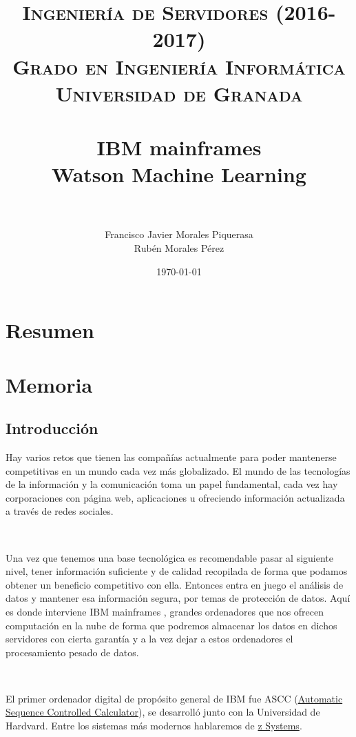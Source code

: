 \documentclass[paper=a4, fontsize=10pt]{scrartcl} %
\title{	
\normalfont \normalsize 
\textsc{\textbf{Ingeniería de Servidores (2016-2017)} \\ Grado en Ingeniería Informática \\ Universidad de Granada} \\ [25pt] %
\horrule{0.5pt} \\[0.4cm] %
\huge IBM mainframes \\ Watson Machine Learning \\ %
\horrule{2pt} \\[0.5cm] %
}
\author{Francisco Javier Morales Piquerasa
	\\ Rubén Morales Pérez} %
\date{\normalsize\today} %
\numberwithin{equation}{section} %
\numberwithin{figure}{section} %
\numberwithin{table}{section} %
\begin{document}
\maketitle %
\newpage %
\tableofcontents %
\listoffigures
\listoftables

\newpage


\section{Resumen}


\section{Memoria}
\subsection{Introducción}
Hay varios retos que tienen las compañías actualmente para poder mantenerse competitivas en un mundo cada vez más globalizado.
El mundo de las tecnologías de la información y la comunicación toma un papel fundamental, cada vez hay corporaciones con página web, aplicaciones u ofreciendo información actualizada a través de redes sociales.

\

Una vez que tenemos una base tecnológica es recomendable pasar al siguiente nivel, tener información suficiente y de calidad recopilada de forma que podamos obtener un beneficio competitivo con ella.
Entonces entra en juego el análisis de datos y mantener esa información segura, por temas de protección de datos.
Aquí es donde interviene IBM mainframes \cite{ibm-m}, grandes ordenadores que nos ofrecen computación en la nube de forma que podremos almacenar los datos en dichos servidores con cierta garantía y a la vez dejar a estos ordenadores el procesamiento pesado de datos.

\

El primer ordenador digital de propósito general de IBM fue ASCC (\href{https://www-03.ibm.com/ibm/history/exhibits/markI/markI_intro.html}{Automatic Sequence Controlled Calculator}), se desarrolló junto con la Universidad de Hardvard. Entre los sistemas más modernos hablaremos de \href{https://www-03.ibm.com/systems/z/}{z Systems}.
\end{document}
